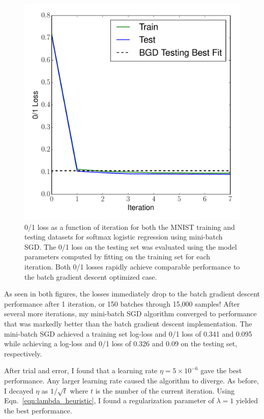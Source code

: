 \documentclass[12pt]{amsart}
\begin{document}
\begin{figure}[H]
	\includegraphics[width=\columnwidth]{sgd_mini_mnist_multi_train_test_01.pdf}
    \caption{0/1 loss as a function of iteration for both the MNIST training and testing datasets for softmax logistic regression using mini-batch SGD.  The 0/1 loss on the testing set was evaluated using the model parameters computed by fitting on the training set for each iteration.  Both 0/1 losses rapidly achieve comparable performance to the batch gradient descent optimized case.}
    \label{fig:sgd_mini_mnist_01}
\end{figure}

As seen in both figures, the losses immediately drop to the batch gradient descent performance after 1 iteration, or 150 batches through 15,000 samples!  After several more iterations, my mini-batch SGD algorithm converged to performance that was markedly better than the batch gradient descent implementation.  The mini-batch SGD achieved a training set log-loss and 0/1 loss of 0.341 and 0.095 while achieving a log-loss and 0/1 loss of 0.326 and 0.09 on the testing set, respectively.

After trial and error, I found that a learning rate $\eta = 5 \times 10^{-6}$ gave the best performance.  Any larger learning rate caused the algorithm to diverge.  As before, I decayed $\eta$ as $1/\sqrt{t}$ where $t$ is the number of the current iteration.  Using Eqn.~\ref{eqn:lambda_heuristic}, I found a regularization parameter of $\lambda = 1$ yielded the best performance.
\end{document}

